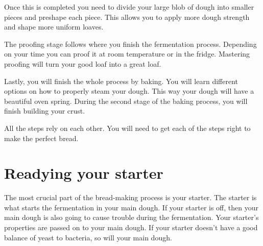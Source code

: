Once this is completed you need to divide your large blob of
dough into smaller pieces and preshape each piece. This allows
you to apply more dough strength and shape more uniform loaves.

The proofing stage follows where you finish the fermentation process.
Depending on your time you can proof it at room temperature or in the fridge.
Mastering proofing will turn your good loaf into a great loaf.

Lastly, you will finish the whole process by baking. You will learn different
options on how to properly steam your dough. This way your
dough will have a beautiful oven spring. During the second
stage of the baking process, you will finish building your crust.

All the steps rely on each other. You will need to get each of
the steps right to make the perfect bread.

\section{Readying your starter}

The most crucial part of the bread-making process is your starter.
The starter is what starts the fermentation in your main dough.
If your starter is off, then your main dough is also going
to cause trouble during the fermentation. Your starter's
properties are passed on to your main dough. If your starter
doesn't have a good balance of yeast to bacteria, so will your
main dough.

